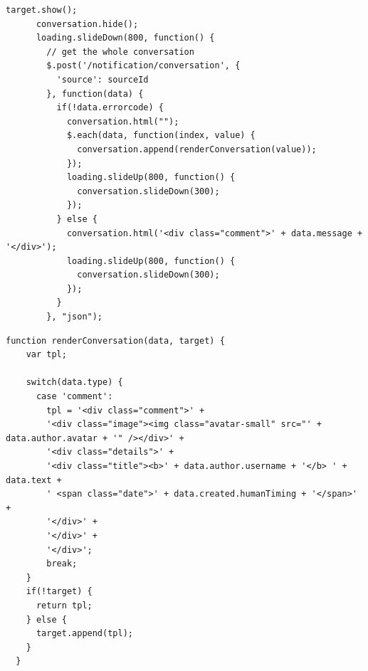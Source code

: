 \begin{lstlisting}[caption=Refreshing the comments of a resource]
	target.show();
      conversation.hide();
      loading.slideDown(800, function() {
        // get the whole conversation
        $.post('/notification/conversation', {
          'source': sourceId
        }, function(data) {
          if(!data.errorcode) {
            conversation.html("");
            $.each(data, function(index, value) {
              conversation.append(renderConversation(value));
            });
            loading.slideUp(800, function() {
              conversation.slideDown(300);
            });
          } else {
            conversation.html('<div class="comment">' + data.message + '</div>');
            loading.slideUp(800, function() {
              conversation.slideDown(300);
            });
          }
        }, "json");
\end{lstlisting}

\begin{lstlisting}[caption=Creating the markup of a single comment]
function renderConversation(data, target) {
    var tpl;
    
    switch(data.type) {
      case 'comment':
        tpl = '<div class="comment">' +
        '<div class="image"><img class="avatar-small" src="' + data.author.avatar + '" /></div>' +
        '<div class="details">' +
        '<div class="title"><b>' + data.author.username + '</b> ' + data.text + 
        ' <span class="date">' + data.created.humanTiming + '</span>' +
        '</div>' +
        '</div>' +
        '</div>';
        break;
    }
    if(!target) {
      return tpl;
    } else {
      target.append(tpl);
    }
  }
\end{lstlisting}